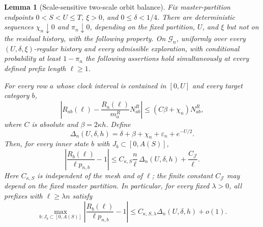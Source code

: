 \documentclass[11pt]{article}
\newtheorem{lemma}[theorem]{Lemma}
\theoremstyle{remark}
\begin{document}
\begin{lemma}[Scale-sensitive two-scale orbit balance]
\label{lem:pd-two-scale-balance}
Fix master-partition endpoints $0<S<U\le T$, $\xi>0$, and
$0\le\delta<1/4$.  There are deterministic sequences
$\chi_n\downarrow0$ and $\pi_n\downarrow0$, depending on the fixed partition,
$U$, and $\xi$ but not on the residual history, with the following property.
On $\mathcal G_n$, uniformly over every $(U,\delta,\xi)$-regular history and
every admissible exploration, with conditional probability at least
$1-\pi_n$ the following assertions hold simultaneously at every defined prefix
length $\ell\ge1$.

For every row $a$ whose clock interval is contained in $[0,U]$ and every target
category $b$,
\begin{equation}
 \left|R_{ab}(\ell)-\frac{R_a(\ell)}{m_a^R}N_{ab}^R\right|
 \le (C\beta+\chi_n)N_{ab}^R,
 \label{eq:pd-row-prefix}
\end{equation}
where $C$ is absolute and $\beta=2\kappa h$.  Define
\[
        \Delta_n(U,\delta,h)
        =\delta+\beta+\chi_n+\varepsilon_n+e^{-U/2}.
\]
Then, for every inner state $b$ with $J_b\subset[0,A(S)]$,
\begin{equation}
 \left|\frac{R_b(\ell)}{\ell p_{n,b}}-1\right|
 \le C_{\kappa,S}\frac n\ell\,
        \Delta_n(U,\delta,h)
      +\frac{C_{\mathcal J}}\ell.
 \label{eq:pd-scale-sensitive-balance}
\end{equation}
Here $C_{\kappa,S}$ is independent of the mesh and of $\ell$; the finite
constant $C_{\mathcal J}$ may depend on the fixed master partition.  In
particular, for every fixed $\lambda>0$, all prefixes with $\ell\ge\lambda n$
satisfy
\[
 \max_{b:J_b\subset[0,A(S)]}
 \left|\frac{R_b(\ell)}{\ell p_{n,b}}-1\right|
 \le C_{\kappa,S,\lambda}\Delta_n(U,\delta,h)+o(1).
\]
\end{lemma}
\end{document}
